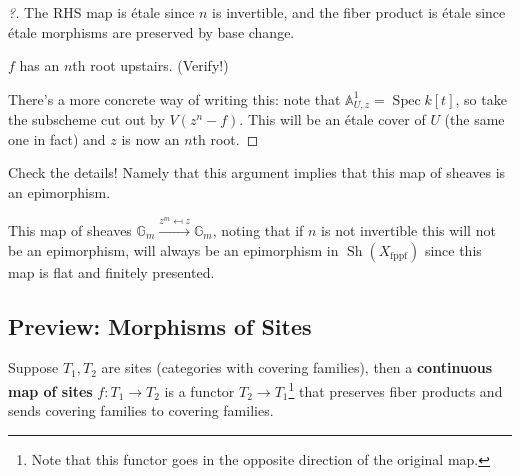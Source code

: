 \begin{example}[?]
\begin{proof}[?]
The RHS map is étale since \(n\) is invertible, and the fiber product is
étale since étale morphisms are preserved by base change.

\begin{claim}

\(f\) has an \(n\)th root upstairs. (Verify!)

\end{claim}

There's a more concrete way of writing this: note that
\({\mathbb{A}}^1_{U, z} = \operatorname{Spec}k[t]\), so take the
subscheme cut out by \(V(z^n - f)\). This will be an étale cover of
\(U\) (the same one in fact) and \(z\) is now an \(n\)th root.

\end{proof}

\end{example}

\begin{exercise}[?]

Check the details! Namely that this argument implies that this map of
sheaves is an epimorphism.

\end{exercise}

\begin{remark}

This map of sheaves
\({\mathbb{G}}_m \xrightarrow{z^m \mapsfrom z} {\mathbb{G}}_m\), noting
that if \(n\) is not invertible this will not be an epimorphism, will
always be an epimorphism in
\({\operatorname{Sh}}(X_\mathrm{\operatorname{fppf}})\) since this map
is flat and finitely presented.

\end{remark}

\hypertarget{preview-morphisms-of-sites}{%
\subsection{Preview: Morphisms of
Sites}\label{preview-morphisms-of-sites}}

\begin{definition}

Suppose \(T_1, T_2\) are sites (categories with covering families), then
a \textbf{continuous map of sites} \(f:T_1 \to T_2\) is a functor
\(T_2 \to T_1\)\footnote{Note that this functor goes in the opposite
  direction of the original map.} that preserves fiber products and
sends covering families to covering families.

\end{definition}

